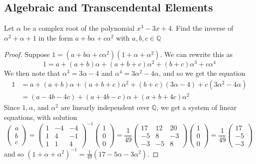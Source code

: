 \documentclass[12pt]{article}
\theoremstyle{remark}
\begin{document}
\subsection{Algebraic and Transcendental Elements}
\begin{problem}
  Let $\alpha$ be a complex root of the polynomial $x^3 - 3x + 4$.  Find the inverse of $\alpha^2 + \alpha + 1$ in the form $a + b\alpha + c\alpha^2$ with $a, b, c \in \mathbb{Q}$
\end{problem}
\begin{proof}
  Suppose $1 = (a + b \alpha + c\alpha^2)(1 + \alpha + \alpha^2)$.  We can rewrite this as
  \begin{equation*}
    1 = a + (a + b)\alpha + (a + b + c)\alpha^2 + (b +c)\alpha^3 + c\alpha^4
  \end{equation*}
  We then note that $\alpha^3 = 3\alpha - 4$ and $\alpha^4 = 3\alpha^2 - 4\alpha$, and so we get the equation
  \begin{align*}
    1 &= a + (a+b)\alpha + (a+b+c)\alpha^2 + (b+c)(3\alpha - 4) + c(3\alpha^2 - 4\alpha)\\
    &= (a - 4b - 4c) + (a + 4b  -c)\alpha + (a+b+4c)\alpha^2
  \end{align*}
  Since $1, \alpha$, and $\alpha^2$ are linearly independent over $\mathbb{Q}$, we get a system of linear equations, with solution
  \begin{equation*}
    \begin{pmatrix}
      a\\
      b\\
      c
    \end{pmatrix} =
    \begin{pmatrix}
      1 & -4 & -4\\
      1 & 4 & -1\\
      1 & 1 & 4
    \end{pmatrix}^{-1}
    \begin{pmatrix}
      1\\
      0\\
      0
    \end{pmatrix} =
    \frac{1}{49} \begin{pmatrix}
      17 & 12 & 20\\
      -5 & 8 & -3\\
      -3 & -5 & 8
    \end{pmatrix}
    \begin{pmatrix}
      1\\
      0\\
      0
    \end{pmatrix} =
    \frac{1}{49} \begin{pmatrix}
      17\\
      -5\\
      -3
    \end{pmatrix}
  \end{equation*}
  and so $(1+\alpha + \alpha^2)^{-1} = \frac{1}{49}(17 - 5\alpha - 3\alpha^2)$.
\end{proof}
\end{document}
